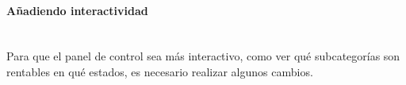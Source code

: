 \documentclass[12pt,letterpaper]{article}
\begin{document}
    \paragraph{\Large Añadiendo interactividad\\ \\}
    Para que el panel de control sea más interactivo, como ver qué subcategorías son rentables en qué estados, es necesario realizar algunos cambios.
\end{document}
